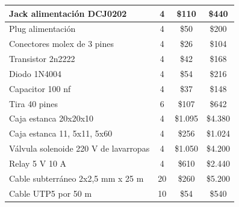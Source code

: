 \documentclass[
11pt, %
codirector, %
]{charter}
\begin{document}
\begin{table}[htpb]
\begin{tabularx}{\linewidth}{@{}|X|c|r|r|@{}}
 Jack alimentación DCJ0202&
  \multicolumn{1}{c|}{4} &
  \multicolumn{1}{c|}{\$110} &
  \multicolumn{1}{c|}{\$440} \\ \hline
 
 Plug alimentación&
  \multicolumn{1}{c|}{4} &
  \multicolumn{1}{c|}{\$50} &
  \multicolumn{1}{c|}{\$200} \\ \hline
 
 Conectores molex de 3 pines&
  \multicolumn{1}{c|}{4} &
  \multicolumn{1}{c|}{\$26} &
  \multicolumn{1}{c|}{\$104} \\ \hline

 Transistor 2n2222&
  \multicolumn{1}{c|}{4} &
  \multicolumn{1}{c|}{\$42} &
  \multicolumn{1}{c|}{\$168} \\ \hline

 Diodo 1N4004&
  \multicolumn{1}{c|}{4} &
  \multicolumn{1}{c|}{\$54} &
  \multicolumn{1}{c|}{\$216} \\ \hline

 Capacitor 100 nf&
  \multicolumn{1}{c|}{4} &
  \multicolumn{1}{c|}{\$37} &
  \multicolumn{1}{c|}{\$148} \\ \hline

 Tira 40 pines&
  \multicolumn{1}{c|}{6} &
  \multicolumn{1}{c|}{\$107} &
  \multicolumn{1}{c|}{\$642} \\ \hline

 Caja estanca 20x20x10&
  \multicolumn{1}{c|}{4} &
  \multicolumn{1}{c|}{\$1.095} &
  \multicolumn{1}{c|}{\$4.380} \\ \hline

 Caja estanca 11, 5x11, 5x60&
  \multicolumn{1}{c|}{4} &
  \multicolumn{1}{c|}{\$256} &
  \multicolumn{1}{c|}{\$1.024} \\ \hline

Válvula solenoide 220 V de lavarropas&
  \multicolumn{1}{c|}{4} &
  \multicolumn{1}{c|}{\$1.050} &
  \multicolumn{1}{c|}{\$4.200} \\ \hline

 Relay 5 V 10 A&
  \multicolumn{1}{c|}{4} &
  \multicolumn{1}{c|}{\$610} &
  \multicolumn{1}{c|}{\$2.440} \\ \hline
  
 Cable subterráneo 2x2,5 mm x 25 m&
  \multicolumn{1}{c|}{20} &
  \multicolumn{1}{c|}{\$260} &
  \multicolumn{1}{c|}{\$5.200} \\ \hline
  
  Cable UTP5 por 50 m&
  \multicolumn{1}{c|}{10} &
  \multicolumn{1}{c|}{\$54} &
  \multicolumn{1}{c|}{\$540} \\ \hline
  

\end{tabularx}
\end{table}
\end{document}
